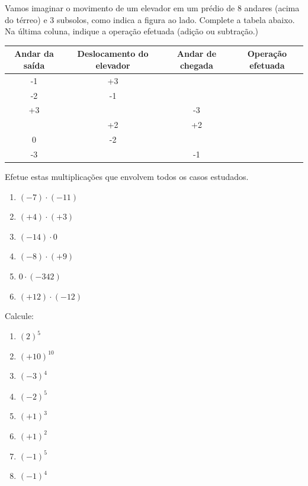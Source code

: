 		\item Vamos imaginar o movimento de um elevador em um prédio de 8 andares (acima do térreo) e 3 subsolos, como indica a figura ao lado. Complete a tabela abaixo. Na última coluna, indique a operação efetuada (adição ou subtração.)
		\newline
		\newline
		\begin{tabular}{|c|c|c|c|}
		\hline 
		Andar da saída & Deslocamento do elevador & Andar de chegada & Operação efetuada \\ 
		\hline 
		-1 & +3 &   &   \\ 
		\hline 
		-2 & -1 &   &   \\ 
		\hline 
		+3 &   & -3 &   \\ 
		\hline 
		  & +2 & +2 &   \\ 
		\hline 
		0 & -2 &   &   \\ 
		\hline 
		-3 &   & -1 &   \\ 
		\hline 
		\end{tabular} 
		
		\item Efetue estas multiplicações que envolvem todos os casos estudados.
		\begin{multicols}{3}
		\begin{enumerate}
			\item $(-7)\cdot(-11)$
			\item $(+4)\cdot(+3)$
			\item $(-14)\cdot0$
			\item $(-8)\cdot(+9)$
			\item $0\cdot(-342)$
			\item $(+12)\cdot(-12)$
		\end{enumerate}
		\end{multicols}
		
		\item Calcule:
		\begin{multicols}{4}
		\begin{enumerate}
			\item $(2)^5$
			\item $(+10)^{10}$
			\item $(-3)^4$
			\item $(-2)^5$
			\item $(+1)^3$
			\item $(+1)^2$
			\item $(-1)^5$
			\item $(-1)^4$
		\end{enumerate}
		\end{multicols}
